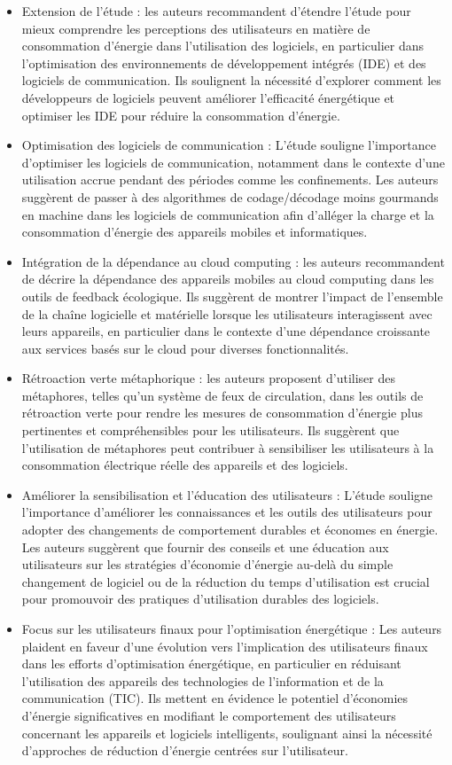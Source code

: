 \begin{itemize}
    \item Extension de l'étude : les auteurs recommandent d'étendre l'étude pour mieux comprendre les perceptions des utilisateurs en matière de consommation d'énergie dans l'utilisation des logiciels, en particulier dans l'optimisation des environnements de développement intégrés (IDE) et des logiciels de communication. Ils soulignent la nécessité d'explorer comment les développeurs de logiciels peuvent améliorer l'efficacité énergétique et optimiser les IDE pour réduire la consommation d'énergie.
    \item Optimisation des logiciels de communication : L’étude souligne l’importance d’optimiser les logiciels de communication, notamment dans le contexte d’une utilisation accrue pendant des périodes comme les confinements. Les auteurs suggèrent de passer à des algorithmes de codage/décodage moins gourmands en machine dans les logiciels de communication afin d’alléger la charge et la consommation d’énergie des appareils mobiles et informatiques.
    \item Intégration de la dépendance au cloud computing : les auteurs recommandent de décrire la dépendance des appareils mobiles au cloud computing dans les outils de feedback écologique. Ils suggèrent de montrer l’impact de l’ensemble de la chaîne logicielle et matérielle lorsque les utilisateurs interagissent avec leurs appareils, en particulier dans le contexte d’une dépendance croissante aux services basés sur le cloud pour diverses fonctionnalités.
    \item Rétroaction verte métaphorique : les auteurs proposent d'utiliser des métaphores, telles qu'un système de feux de circulation, dans les outils de rétroaction verte pour rendre les mesures de consommation d'énergie plus pertinentes et compréhensibles pour les utilisateurs. Ils suggèrent que l’utilisation de métaphores peut contribuer à sensibiliser les utilisateurs à la consommation électrique réelle des appareils et des logiciels.
    \item Améliorer la sensibilisation et l'éducation des utilisateurs : L'étude souligne l'importance d'améliorer les connaissances et les outils des utilisateurs pour adopter des changements de comportement durables et économes en énergie. Les auteurs suggèrent que fournir des conseils et une éducation aux utilisateurs sur les stratégies d'économie d'énergie au-delà du simple changement de logiciel ou de la réduction du temps d'utilisation est crucial pour promouvoir des pratiques d'utilisation durables des logiciels.
    \item Focus sur les utilisateurs finaux pour l'optimisation énergétique : Les auteurs plaident en faveur d'une évolution vers l'implication des utilisateurs finaux dans les efforts d'optimisation énergétique, en particulier en réduisant l'utilisation des appareils des technologies de l'information et de la communication (TIC). Ils mettent en évidence le potentiel d'économies d'énergie significatives en modifiant le comportement des utilisateurs concernant les appareils et logiciels intelligents, soulignant ainsi la nécessité d'approches de réduction d'énergie centrées sur l'utilisateur.
\end{itemize}

